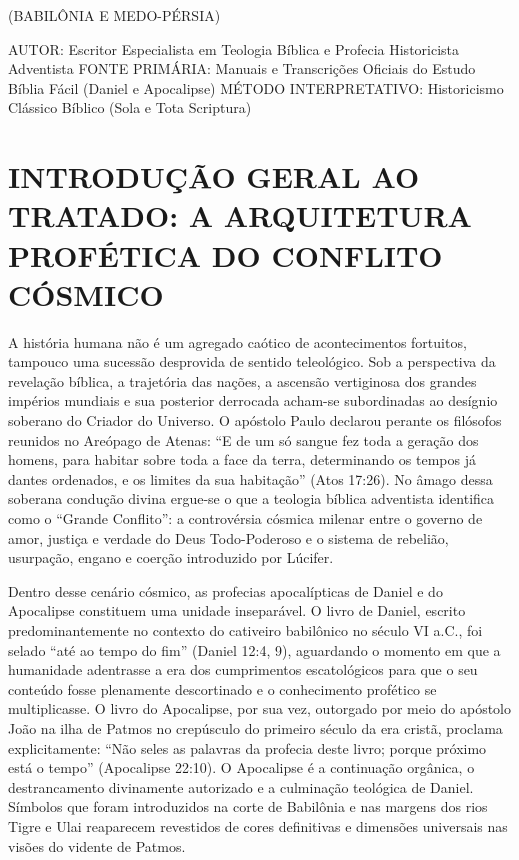 \documentclass[11pt,a4paper,openany]{book}
\begin{document}
(BABILÔNIA E MEDO-PÉRSIA)

AUTOR: Escritor Especialista em Teologia Bíblica e Profecia Historicista Adventista
FONTE PRIMÁRIA: Manuais e Transcrições Oficiais do Estudo Bíblia Fácil (Daniel e Apocalipse)
MÉTODO INTERPRETATIVO: Historicismo Clássico Bíblico (Sola e Tota Scriptura)


\section{INTRODUÇÃO GERAL AO TRATADO: A ARQUITETURA PROFÉTICA DO CONFLITO CÓSMICO}


A história humana não é um agregado caótico de acontecimentos fortuitos, tampouco uma sucessão desprovida de sentido teleológico. Sob a perspectiva da revelação bíblica, a trajetória das nações, a ascensão vertiginosa dos grandes impérios mundiais e sua posterior derrocada acham-se subordinadas ao desígnio soberano do Criador do Universo. O apóstolo Paulo declarou perante os filósofos reunidos no Areópago de Atenas: ``E de um só sangue fez toda a geração dos homens, para habitar sobre toda a face da terra, determinando os tempos já dantes ordenados, e os limites da sua habitação'' (Atos 17:26). No âmago dessa soberana condução divina ergue-se o que a teologia bíblica adventista identifica como o ``Grande Conflito'': a controvérsia cósmica milenar entre o governo de amor, justiça e verdade do Deus Todo-Poderoso e o sistema de rebelião, usurpação, engano e coerção introduzido por Lúcifer.

Dentro desse cenário cósmico, as profecias apocalípticas de Daniel e do Apocalipse constituem uma unidade inseparável. O livro de Daniel, escrito predominantemente no contexto do cativeiro babilônico no século VI a.C., foi selado ``até ao tempo do fim'' (Daniel 12:4, 9), aguardando o momento em que a humanidade adentrasse a era dos cumprimentos escatológicos para que o seu conteúdo fosse plenamente descortinado e o conhecimento profético se multiplicasse. O livro do Apocalipse, por sua vez, outorgado por meio do apóstolo João na ilha de Patmos no crepúsculo do primeiro século da era cristã, proclama explicitamente: ``Não seles as palavras da profecia deste livro; porque próximo está o tempo'' (Apocalipse 22:10). O Apocalipse é a continuação orgânica, o destrancamento divinamente autorizado e a culminação teológica de Daniel. Símbolos que foram introduzidos na corte de Babilônia e nas margens dos rios Tigre e Ulai reaparecem revestidos de cores definitivas e dimensões universais nas visões do vidente de Patmos.
\end{document}
